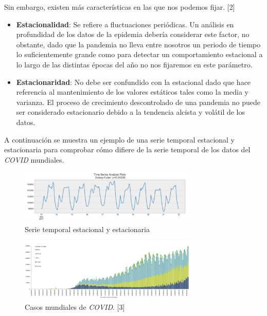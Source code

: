 \documentclass[12pt,a4paper, xcolor=table]{article}
\begin{document}
        \vspace{2mm}
        
        Sin embargo, existen más características en las que nos podemos fijar. [2] 
    \begin{itemize}
    \item \textbf{Estacionalidad}: Se refiere a fluctuaciones periódicas. Un análisis en profundidad de los datos de la epidemia debería considerar este factor, no obstante, dado que la pandemia no lleva entre nosotros un periodo de tiempo lo suficientemente grande como para detectar un comportamiento estacional a lo largo de las distintas épocas del año no nos fijaremos en este parámetro.
    \item \textbf{Estacionaridad}: No debe ser confundido con la estacional dado que hace referencia al mantenimiento de los valores estáticos tales como la media y varianza. El proceso de crecimiento descontrolado de una pandemia no puede ser considerado estacionario debido a la tendencia alcista y volátil de los datos.
    \end{itemize}
    
    A continuación se muestra un ejemplo de una serie temporal estacional y estacionaria para comprobar cómo difiere de la serie temporal de los datos del \textit{COVID} mundiales.
    
        \begin{figure}[h]
                \centering
                \includegraphics[width=320px]{img/estacional.png}
                \caption{Serie temporal estacional y estacionaria}
                \label{fig:graf_exp1}
            \end{figure}
            
            
        \begin{figure}[h]
                \centering
                \includegraphics[width=320px]{img/covid-cases.png}
                \caption{Casos mundiales de \textit{COVID}. [3]}
                \label{fig:graf_exp1}
            \end{figure}
            
\end{document}
